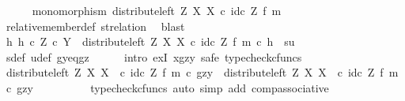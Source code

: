 \begin{isabellebody}
\ \ \ \ \isamarkupfalse%
\ {\isachardoublequoteopen}monomorphism\ {\isacharparenleft}{\kern0pt}distribute{\isacharunderscore}{\kern0pt}left\ Z\ X\ X\ {\isasymcirc}\isactrlsub c\ id\isactrlsub c\ Z\ {\isasymtimes}\isactrlsub f\ m{\isacharparenright}{\kern0pt}{\isachardoublequoteclose}\isanewline
\ \ \ \ \ \ \isamarkupfalse%
\ relative{\isacharunderscore}{\kern0pt}member{\isacharunderscore}{\kern0pt}def{}\ st{\isacharunderscore}{\kern0pt}relation\ \isamarkupfalse%
\ blast\isanewline
\ \ \ \ \isamarkupfalse%
\ {\isachardoublequoteopen}{\isasymexists}h{\isachardot}{\kern0pt}\ h\ {\isasymin}\isactrlsub c\ Z\ {\isasymtimes}\isactrlsub c\ Y\ {\isasymand}\ {\isacharparenleft}{\kern0pt}distribute{\isacharunderscore}{\kern0pt}left\ Z\ X\ X\ {\isasymcirc}\isactrlsub c\ id\isactrlsub c\ Z\ {\isasymtimes}\isactrlsub f\ m{\isacharparenright}{\kern0pt}\ {\isasymcirc}\isactrlsub c\ h\ {\isacharequal}{\kern0pt}\ {\isasymlangle}s{\isacharcomma}{\kern0pt}u{\isasymrangle}{\isachardoublequoteclose}\isanewline
\ \ \ \ \ \ \isamarkupfalse%
\ s{\isacharunderscore}{\kern0pt}def\ u{\isacharunderscore}{\kern0pt}def\ gy{\isacharunderscore}{\kern0pt}eq{\isacharunderscore}{\kern0pt}gz\isanewline
\ \ \ \ \isamarkupfalse%
\ {\isacharparenleft}{\kern0pt}intro\ exI{\isacharbrackleft}{\kern0pt}\ x{\isacharequal}{\kern0pt}{\isachardoublequoteopen}{\isasymlangle}gz{\isacharcomma}{\kern0pt}y{\isasymrangle}{\isachardoublequoteclose}{\isacharbrackright}{\kern0pt}{\isacharcomma}{\kern0pt}\ safe{\isacharcomma}{\kern0pt}\ typecheck{\isacharunderscore}{\kern0pt}cfuncs{\isacharparenright}{\kern0pt}\isanewline
\ \ \ \ \ \ \isamarkupfalse%
\ {\isachardoublequoteopen}{\isacharparenleft}{\kern0pt}distribute{\isacharunderscore}{\kern0pt}left\ Z\ X\ X\ \ {\isasymcirc}\isactrlsub c\ {\isacharparenleft}{\kern0pt}id\isactrlsub c\ Z\ {\isasymtimes}\isactrlsub f\ m{\isacharparenright}{\kern0pt}{\isacharparenright}{\kern0pt}\ {\isasymcirc}\isactrlsub c\ {\isasymlangle}gz{\isacharcomma}{\kern0pt}y{\isasymrangle}\ {\isacharequal}{\kern0pt}\ distribute{\isacharunderscore}{\kern0pt}left\ Z\ X\ X\ \ {\isasymcirc}\isactrlsub c\ {\isacharparenleft}{\kern0pt}id\isactrlsub c\ Z\ {\isasymtimes}\isactrlsub f\ m{\isacharparenright}{\kern0pt}\ {\isasymcirc}\isactrlsub c\ {\isasymlangle}gz{\isacharcomma}{\kern0pt}y{\isasymrangle}{\isachardoublequoteclose}\isanewline
\ \ \ \ \ \ \ \ \isamarkupfalse%
\ {\isacharparenleft}{\kern0pt}typecheck{\isacharunderscore}{\kern0pt}cfuncs{\isacharcomma}{\kern0pt}\ auto\ simp\ add{\isacharcolon}{\kern0pt}\ comp{\isacharunderscore}{\kern0pt}associative{}{\isacharparenright}{\kern0pt}\isanewline

\end{isabellebody}
